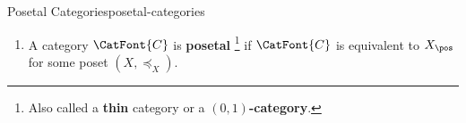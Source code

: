 \begin{definition}{Posetal Categories}{posetal-categories}
\begin{enumerate}
\begin{itemize}
            \end{itemize}
        \item\label{posetal-categories-posetal-categories}A category $\CatFont{C}$ is \textbf{posetal}%
            \footnote{%
                Also called a \textbf{thin} category or a \textbf{$(0,1)$-category}.
                \par\vspace*{\TCBBoxCorrection}
            } %
            if $\CatFont{C}$ is equivalent to $X_{\pos}$ for some poset $(X,\preceq_{X})$.
    \end{enumerate}
\end{definition}
